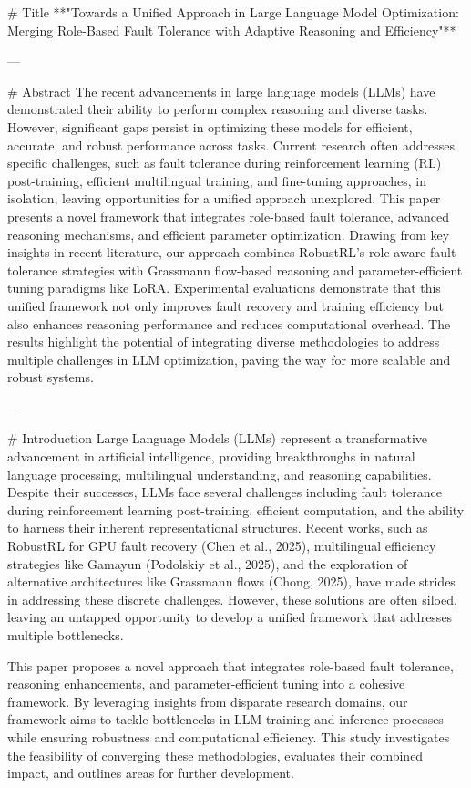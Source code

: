 # Title  
**"Towards a Unified Approach in Large Language Model Optimization: Merging Role-Based Fault Tolerance with Adaptive Reasoning and Efficiency"**

---

# Abstract  
The recent advancements in large language models (LLMs) have demonstrated their ability to perform complex reasoning and diverse tasks. However, significant gaps persist in optimizing these models for efficient, accurate, and robust performance across tasks. Current research often addresses specific challenges, such as fault tolerance during reinforcement learning (RL) post-training, efficient multilingual training, and fine-tuning approaches, in isolation, leaving opportunities for a unified approach unexplored. This paper presents a novel framework that integrates role-based fault tolerance, advanced reasoning mechanisms, and efficient parameter optimization. Drawing from key insights in recent literature, our approach combines RobustRL's role-aware fault tolerance strategies with Grassmann flow-based reasoning and parameter-efficient tuning paradigms like LoRA. Experimental evaluations demonstrate that this unified framework not only improves fault recovery and training efficiency but also enhances reasoning performance and reduces computational overhead. The results highlight the potential of integrating diverse methodologies to address multiple challenges in LLM optimization, paving the way for more scalable and robust systems.

---

# Introduction  
Large Language Models (LLMs) represent a transformative advancement in artificial intelligence, providing breakthroughs in natural language processing, multilingual understanding, and reasoning capabilities. Despite their successes, LLMs face several challenges including fault tolerance during reinforcement learning post-training, efficient computation, and the ability to harness their inherent representational structures. Recent works, such as RobustRL for GPU fault recovery (Chen et al., 2025), multilingual efficiency strategies like Gamayun (Podolskiy et al., 2025), and the exploration of alternative architectures like Grassmann flows (Chong, 2025), have made strides in addressing these discrete challenges. However, these solutions are often siloed, leaving an untapped opportunity to develop a unified framework that addresses multiple bottlenecks.

This paper proposes a novel approach that integrates role-based fault tolerance, reasoning enhancements, and parameter-efficient tuning into a cohesive framework. By leveraging insights from disparate research domains, our framework aims to tackle bottlenecks in LLM training and inference processes while ensuring robustness and computational efficiency. This study investigates the feasibility of converging these methodologies, evaluates their combined impact, and outlines areas for further development.

